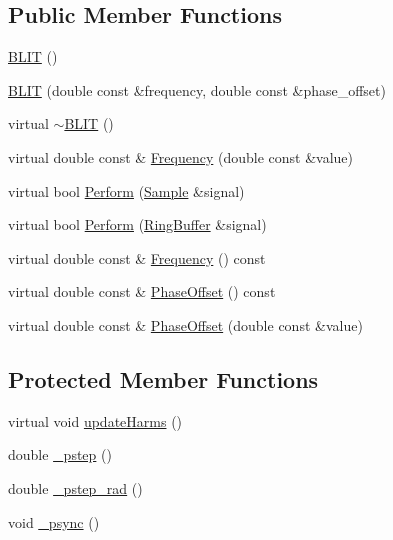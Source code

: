 \subsection*{Public Member Functions}
\begin{DoxyCompactItemize}
\item 
\hyperlink{classSignal_1_1BLIT_1_1BLIT_ad22461c308981ee86ddc8b992bfbaf27}{B\+L\+I\+T} ()
\item 
\hyperlink{classSignal_1_1BLIT_1_1BLIT_af4f90ac6dfddc173dd0b381f6582dac9}{B\+L\+I\+T} (double const \&frequency, double const \&phase\+\_\+offset)
\item 
virtual \hyperlink{classSignal_1_1BLIT_1_1BLIT_a9355800dce797a6d35d8bbfc7eb9b834}{$\sim$\+B\+L\+I\+T} ()
\item 
virtual double const \& \hyperlink{classSignal_1_1BLIT_1_1BLIT_a59110620478308054d4c932c613e5cc6}{Frequency} (double const \&value)
\item 
virtual bool \hyperlink{classSignal_1_1BLIT_1_1BLIT_a98982b34bc6c9ca4c2e91550afa31375}{Perform} (\hyperlink{classSignal_1_1Sample}{Sample} \&signal)
\item 
virtual bool \hyperlink{classSignal_1_1BLIT_1_1BLIT_a2f0ee604ed0e67557aa9f7e7f50d80ec}{Perform} (\hyperlink{classSignal_1_1RingBuffer}{Ring\+Buffer} \&signal)
\item 
virtual double const \& \hyperlink{classSignal_1_1SignalGenerator_a96af42ee68f94e9b04d034fd68b73ecd}{Frequency} () const 
\item 
virtual double const \& \hyperlink{classSignal_1_1SignalGenerator_ac2538ec946f001e394d2416fda698d1c}{Phase\+Offset} () const 
\item 
virtual double const \& \hyperlink{classSignal_1_1SignalGenerator_ac6a103ff72beaa338f6d18c812522d78}{Phase\+Offset} (double const \&value)
\end{DoxyCompactItemize}
\subsection*{Protected Member Functions}
\begin{DoxyCompactItemize}
\item 
virtual void \hyperlink{classSignal_1_1BLIT_1_1BLIT_abec1466e0fe67fcdd52127ab34b7a3a4}{update\+Harms} ()
\item 
double \hyperlink{classSignal_1_1SignalGenerator_a43b0eec84ee7df04c947533c0511c2c0}{\+\_\+pstep} ()
\item 
double \hyperlink{classSignal_1_1SignalGenerator_abf2f4ab977c6e84bf85022eab8135304}{\+\_\+pstep\+\_\+rad} ()
\item 
void \hyperlink{classSignal_1_1SignalGenerator_a563f57d4dfd8728a6a572f15c1e2532b}{\+\_\+psync} ()
\end{DoxyCompactItemize}
